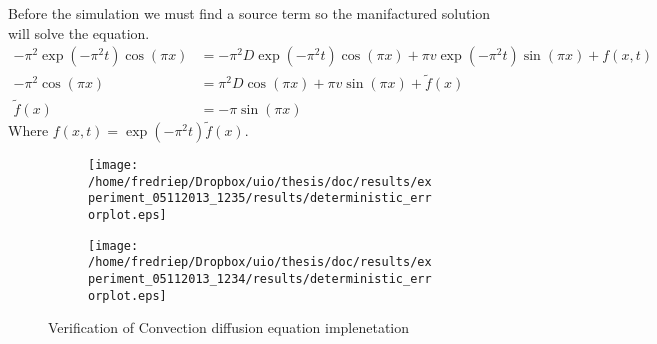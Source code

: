 Before the simulation we must find a source term so the manifactured solution will solve the equation.
\begin{align*}
 -\pi^2\exp\left(-\pi^2t\right)\cos\left(\pi x\right) &= -\pi^2D\exp\left(-\pi^2t\right)\cos\left(\pi x\right) + \pi v \exp\left(-\pi^2t\right)\sin\left(\pi x\right) + f(x,t)\\
 -\pi^2\cos\left(\pi x\right) &= \pi^2D\cos\left(\pi x\right) +\pi v \sin\left(\pi x\right) + \tilde{f}(x) \\
 \tilde{f}(x) &= -\pi\sin\left(\pi x\right)
\end{align*}
Where $f(x,t) = \exp\left(-\pi^2t\right)\tilde{f}(x)$.

\begin{figure}[H]
\centering
\begin{subfigure}[b]{0.48\textwidth}
\texttt{[image: /home/fredriep/Dropbox/uio/thesis/doc/results/experiment\_05112013\_1235/results/deterministic\_errorplot.eps]}
\caption{}
\label{Verification_convection_diffusion:single_dt}
\end{subfigure}
\begin{subfigure}[b]{0.48\textwidth}
\texttt{[image: /home/fredriep/Dropbox/uio/thesis/doc/results/experiment\_05112013\_1234/results/deterministic\_errorplot.eps]}
\caption{}
\label{Verification_convection_diffusion:double_dt}
\end{subfigure}
\caption[Verification of Convection diffusion equation implenetation]{Verification of Convection diffusion equation implenetation}
\label{Verification_convection_diffusion}
\end{figure}

